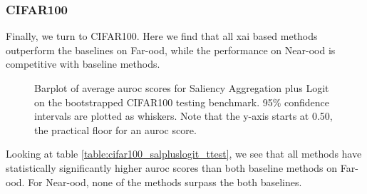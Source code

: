 \documentclass[UKenglish]{uiomasterthesis} %
\theoremstyle{definition}
\begin{document}
\newpage

\subsubsection{CIFAR100}

Finally, we turn to CIFAR100. Here we find that all \ac{xai} based methods outperform the baselines on Far-\ac{ood}, while the performance on Near-\ac{ood} is competitive with baseline methods.

\begin{figure}[hbtp]
    \begin{center}
        
    \end{center}
    \caption[CIFAR100 Saliency Aggregation plus Logit Bootstrap]{Barplot of average \ac{auroc} scores for Saliency Aggregation plus Logit on the bootstrapped CIFAR100 testing benchmark. 95\% confidence intervals are plotted as whiskers. Note that the y-axis starts at 0.50, the practical floor for an \ac{auroc} score.}
    \label{fig:cifar100_salpluslogit_bootstrap_barplot}
\end{figure}

Looking at table \ref{table:cifar100_salpluslogit_ttest}, we see that all methods have statistically significantly higher \ac{auroc} scores than both baseline methods on Far-\ac{ood}. For Near-\ac{ood}, none of the methods surpass the both baselines.
\end{document}
